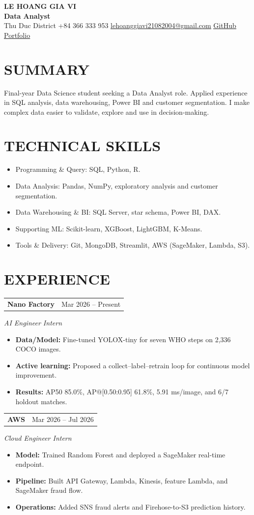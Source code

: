 \documentclass[10pt,letterpaper]{article}
\makeatletter
\newcommand{\cvsection}[2]{\section*{\faIcon{#1}\hspace{0.45em}#2}}
\newcommand{\cvitem}[1]{%
  \item \normalsize #1
}
\newcommand{\cvjobentry}[3]{%
  \begin{tabularx}{\textwidth}{@{}X>{\raggedleft\arraybackslash}p{1.52in}@{}}
    \textbf{#1} & \normalsize #2 \\
  \end{tabularx}\par
  \vspace{0.10em}\normalsize\textit{#3}\par\vspace{0.08em}
}
\newcommand{\cvlink}[2]{\href{#1}{\underline{#2}}}
\newcommand{\cvrole}{AI Engineer}
\newcommand{\cvportfoliohref}{https://lehoanggiavi.github.io/portfolio/?role=ai}
\newcommand{\cvsummary}{Final-year Data Science student seeking an AI Engineer role. Experienced in computer vision, machine learning, LLM/RAG applications and cloud AI deployment. I build practical systems from data and model evaluation through to real-time inference, retrieval and deployment.}
\newcommand{\cvskills}{%
  \cvitem{Programming \& Query: Python, SQL, R.}
  \cvitem{Machine Learning: Scikit-learn, XGBoost, LightGBM.}
  \cvitem{Deep Learning \& Vision: TensorFlow, PyTorch, YOLO, CNN, LSTM.}
  \cvitem{LLM \& Retrieval: RAG, LangChain, Chroma, FAISS.}
  \cvitem{Data, Tools \& Cloud: SQL Server, Power BI, Git, MongoDB, Streamlit, AWS (SageMaker, Lambda, S3).}
}
\renewcommand{\cvrole}{Data Scientist}%
\renewcommand{\cvportfoliohref}{https://lehoanggiavi.github.io/portfolio/?role=ds}%
\renewcommand{\cvsummary}{Final-year Data Science student seeking a Data Scientist role. Applied experience in predictive modeling, imbalanced classification, customer segmentation and model evaluation. I turn data questions into reproducible analyses and useful machine-learning systems.}%
\renewcommand{\cvskills}{%
    \cvitem{Programming \& Query: Python, SQL, R.}
    \cvitem{Data Analysis: Pandas, NumPy, SQL Server, Power BI.}
    \cvitem{Machine Learning \& Evaluation: Scikit-learn, XGBoost, LightGBM, feature preparation and imbalanced-data workflows.}
    \cvitem{Deep Learning: TensorFlow, PyTorch, CNN, LSTM, YOLO.}
    \cvitem{Tools \& Delivery: Git, MongoDB, Streamlit, AWS (SageMaker, Lambda, S3).}
  }%
\renewcommand{\cvrole}{Data Analyst}%
\renewcommand{\cvportfoliohref}{https://lehoanggiavi.github.io/portfolio/?role=da}%
\renewcommand{\cvsummary}{Final-year Data Science student seeking a Data Analyst role. Applied experience in SQL analysis, data warehousing, Power BI and customer segmentation. I make complex data easier to validate, explore and use in decision-making.}%
\renewcommand{\cvskills}{%
      \cvitem{Programming \& Query: SQL, Python, R.}
      \cvitem{Data Analysis: Pandas, NumPy, exploratory analysis and customer segmentation.}
      \cvitem{Data Warehousing \& BI: SQL Server, star schema, Power BI, DAX.}
      \cvitem{Supporting ML: Scikit-learn, XGBoost, LightGBM, K-Means.}
      \cvitem{Tools \& Delivery: Git, MongoDB, Streamlit, AWS (SageMaker, Lambda, S3).}
    }%
\makeatother
\begin{document}
\begin{center}
  {\fontsize{20}{23}\selectfont\bfseries LE HOANG GIA VI}\\[0.25em]
  {\fontsize{17}{20}\selectfont\bfseries \cvrole}\\[0.5em]
  {\small
  \hspace{0.2em}Thu Duc District
  \quad
  \hspace{0.2em}+84 366 333 953
  \quad
  \hspace{0.2em}\cvlink{mailto:lehoanggiavi21082004@gmail.com}{lehoanggiavi21082004@gmail.com}
  \quad
  \hspace{0.2em}\cvlink{https://github.com/lehoanggiavi}{GitHub}
  \quad
  \hspace{0.2em}\cvlink{\cvportfoliohref}{Portfolio}}
\end{center}

\cvsection{user}{SUMMARY}
\normalsize
\cvsummary

\cvsection{tools}{TECHNICAL SKILLS}
\begin{itemize}[leftmargin=1.75em,itemsep=0.12em,topsep=0.1em]
  \cvskills
\end{itemize}

\cvsection{briefcase}{EXPERIENCE}
\cvjobentry{Nano Factory}{Mar 2026 -- Present}{AI Engineer Intern}
\begin{itemize}[leftmargin=1.75em,itemsep=0.12em,topsep=0.2em]
  \cvitem{\textbf{Data/Model:} Fine-tuned YOLOX-tiny for seven WHO steps on 2,336 COCO images.}
  \cvitem{\textbf{Active learning:} Proposed a collect--label--retrain loop for continuous model improvement.}
  \cvitem{\textbf{Results:} AP50 85.0\%, AP@[0.50:0.95] 61.8\%, 5.91 ms/image, and 6/7 holdout matches.}
\end{itemize}

\vspace{0.45em}
\cvjobentry{AWS}{Mar 2026 -- Jul 2026}{Cloud Engineer Intern}
\begin{itemize}[leftmargin=1.75em,itemsep=0.12em,topsep=0.2em]
  \cvitem{\textbf{Model:} Trained Random Forest and deployed a SageMaker real-time endpoint.}
  \cvitem{\textbf{Pipeline:} Built API Gateway, Lambda, Kinesis, feature Lambda, and SageMaker fraud flow.}
  \cvitem{\textbf{Operations:} Added SNS fraud alerts and Firehose-to-S3 prediction history.}
\end{itemize}
\end{document}
